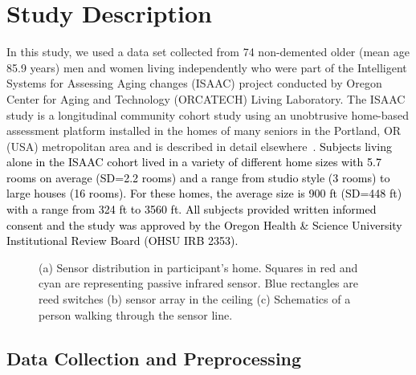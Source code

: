 \documentclass[journal]{IEEEtran}
\newcommand{\DA}[1]{\textcolor{black}{#1}}
\begin{document}
\section{Study Description }
In this study, we used a data set collected from 74 non-demented older (mean age  85.9 years) men and women living independently who were part of the Intelligent Systems for Assessing Aging changes (ISAAC) project conducted by Oregon Center for Aging and Technology (ORCATECH) Living Laboratory. The ISAAC study is a longitudinal community cohort study using an unobtrusive home-based assessment platform installed in the homes of many seniors in the Portland, OR (USA) metropolitan area and is described in detail elsewhere~\cite{Kaye2011}.  \DA{Subjects living alone in the ISAAC cohort lived in a variety of different home sizes with 5.7 rooms on average (SD=2.2 rooms) and a range from studio style (3 rooms) to large houses (16 rooms).  For these homes, the average size is 900 ft (SD=448 ft) with a range from 324 ft to 3560 ft.  All subjects provided written informed consent and the study was approved by the Oregon Health \& Science University Institutional Review Board (OHSU IRB 2353).}


\begin{figure}
\centering
{}
\caption{(a) Sensor distribution in participant's home. Squares in red and cyan are representing passive infrared sensor. Blue rectangles are reed switches (b) sensor array in the ceiling (c) Schematics of a person walking through the sensor line.}
\label{fig:miscelleneous}
\end{figure}

\subsection{Data Collection and Preprocessing}
\end{document}
